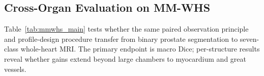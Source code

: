 \begin{table}[t]
\centering
\caption{PROMISE12 comparison under the fixed 35/5/10 split. Higher Dice/Jaccard and lower HD95/ASD are better. Mean$\pm$SD is computed over patients.}
\label{tab:promise_main}
\end{table}

\subsection{Cross-Organ Evaluation on MM-WHS}
Table~\ref{tab:mmwhs_main} tests whether the same paired observation principle and profile-design procedure transfer from binary prostate segmentation to seven-class whole-heart MRI. The primary endpoint is macro Dice; per-structure results reveal whether gains extend beyond large chambers to myocardium and great vessels.

